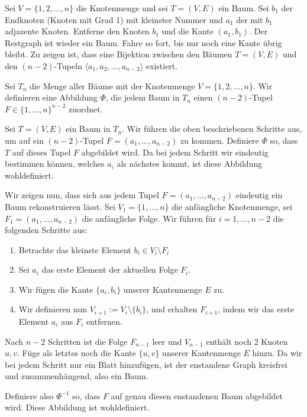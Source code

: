 \documentclass[12pt]{article}
\begin{document}
Sei $V = \{1,2,\dots,n\}$ die Knotenmenge und sei $T = (V, E)$ ein Baum. Sei $b_1$ der Endknoten (Knoten mit Grad 1) mit kleinster Nummer und $a_1$ der mit $b_1$ adjazente Knoten. Entferne den Knoten $b_1$ und die Kante $(a_1, b_1)$. Der Restgraph ist wieder ein Baum. Fahre so fort, bis nur noch eine Kante übrig bleibt. Zu zeigen ist, dass eine Bijektion zwischen den Bäumen $T = (V, E)$ und den $(n-2)$-Tupeln $\langle a_1, a_2,\dots,a_{n-2} \rangle$ existiert.


Sei $T_n$ die Menge aller Bäume mit der Knotenmenge $V = \{1,2,\dots,n\}$. Wir definieren eine Abbildung $\Phi$, die jedem Baum in $T_n$ einen $(n-2)$-Tupel $F \in \{1,\dots,n\}^{n-2}$ zuordnet.

Sei $T = (V, E)$ ein Baum in $T_n$. Wir führen die oben beschriebenen Schritte aus, um auf ein $(n-2)$-Tupel $F = (a_1,\dots,a_{n-2})$ zu kommen. Definiere $\Phi$ so, dass $T$ auf dieses Tupel $F$ abgebildet wird. Da bei jedem Schritt wir eindeutig bestimmen können, welches $a_i$ als nächstes kommt, ist diese Abbildung wohldefiniert.

Wir zeigen nun, dass sich aus jedem Tupel $F = (a_1, \dots, a_{n-2})$ eindeutig ein Baum rekonstruieren lässt. Sei $V_1 = \{1,\dots,n\}$ die anfängliche Knotenmenge, sei $F_1 = (a_1,\dots,a_{n-2})$ die anfängliche Folge. Wir führen für $i = 1,\dots,n-2$ die folgenden Schritte aus:
\begin{enumerate}
    \item Betrachte das kleinste Element $b_i \in V_i \setminus F_i$
    \item Sei $a_i$ das erste Element der aktuellen Folge $F_i$.
    \item Wir fügen die Kante $\{a_i, b_i\}$ unserer Kantenmenge $E$ zu.
    \item Wir definieren nun $V_{i+1} := V_i \setminus \{b_i\}$, und erhalten $F_{i+1}$, indem wir das erste Element $a_i$ aus $F_i$ entfernen.
\end{enumerate}

Nach $n-2$ Schritten ist die Folge $F_{n-1}$ leer und $V_{n-1}$ enthält noch 2 Knoten $u, v$. Füge als letztes noch die Kante $\{u, v\}$ unserer Kantenmenge $E$ hinzu. Da wir bei jedem Schritt nur ein Blatt hinzufügen, ist der enstandene Graph kreisfrei und zusammenhängend, also ein Baum.

Definiere also $\Phi^{-1}$ so, dass $F$ auf genau diesen enstandenen Baum abgebildet wird. Diese Abbildung ist wohldefiniert.
\end{document}
